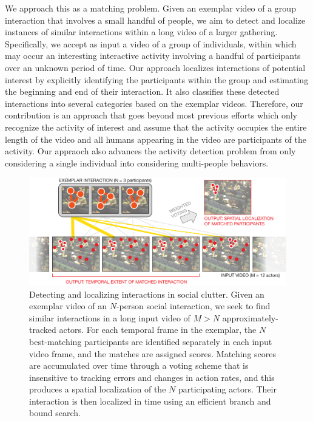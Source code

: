 \documentclass[10pt,twocolumn,letterpaper]{article}
\begin{document}
We approach this as a matching problem. Given an exemplar video of a group interaction that involves a small handful of people, we aim to detect and localize instances of similar interactions within a long video of a larger gathering. 
Specifically, we accept as input a video of a group of individuals, within which may occur an interesting interactive activity involving a handful of participants over an unknown period of time. Our approach localizes interactions of potential interest by explicitly identifying the participants within the group and estimating the beginning and end of their interaction. It also classifies these detected interactions into several categories based on the exemplar videos. Therefore, our  contribution is an approach that goes beyond most previous efforts \cite{Hongeng:act,Gong:act,Hakeem:act,McCowan:meeting,Ni:group,Choi:recogtrack,Intille:act,Vlad:group} which only recognize the activity of interest and assume that the activity occupies the entire length of the video and all humans appearing in the video are participants of the activity. Our appraoch also advances the activity detection problem from only considering a single individual \cite{Ke:detection,Yuan:detection,Shechtman:detection,Hu:detection,Laptev:detection,Duchenne:detection} into considering multi-people behaviors.

\begin{figure}[t]
\begin{center}
\includegraphics[width=\columnwidth]{voting.pdf}
\end{center}
\caption{Detecting and localizing interactions in social clutter. Given an exemplar video of an $N$-person social interaction, we seek to find similar interactions in a long input video of $M>N$ approximately-tracked actors. For each temporal frame in the exemplar, the $N$ best-matching participants are identified separately in each input video frame, and the matches are assigned scores. Matching scores are accumulated over time through a voting scheme that is insensitive to tracking errors and changes in action rates, and this produces a spatial localization of the $N$ participating actors. Their interaction is then localized in time using an efficient branch and bound search.}
\label{diagram}
\end{figure}
\end{document}
